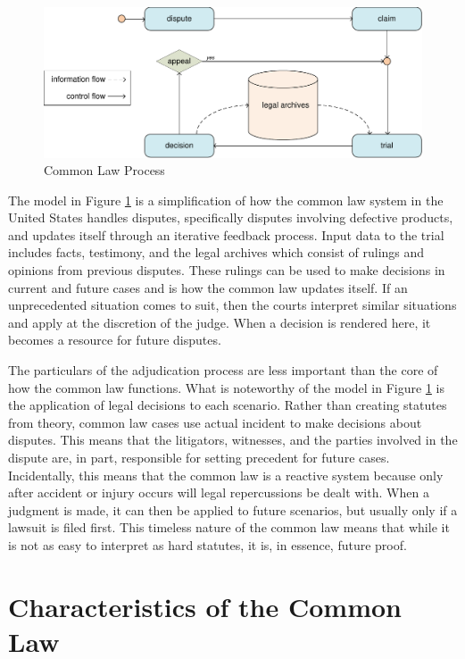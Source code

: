 \documentclass[12pt]{report}
\begin{document}
\begin{figure}[t] 
\begin{center} 
\includegraphics[scale=0.73]{figures/commonlaw.pdf} 
\end{center} 
\caption{Common Law Process} 
\label{fig:commonlaw} 
\end{figure} 

The model in Figure \ref{fig:commonlaw} is a simplification of how the common law system in the United States handles disputes, specifically disputes involving defective products, and updates itself through an iterative feedback process. Input data to the trial includes facts, testimony, and the legal archives which consist of rulings and opinions from previous disputes. These rulings can be used to make decisions in current and future cases and is how the common law updates itself. If an unprecedented situation comes to suit, then the courts interpret similar situations and apply at the discretion of the judge. When a decision is rendered here, it becomes a resource for future disputes.

The particulars of the adjudication process are less important than the core of how the common law functions. What is noteworthy of the model in Figure \ref{fig:commonlaw} is the application of legal decisions to each scenario. Rather than creating statutes from theory, common law cases use actual incident to make decisions about disputes. This means that the litigators, witnesses, and the parties involved in the dispute are, in part, responsible for setting precedent for future cases. Incidentally, this means that the common law is a reactive system because only after accident or injury occurs will legal repercussions be dealt with. When a judgment is made, it can then be applied to future scenarios, but usually only if a lawsuit is filed first. This timeless nature of the common law means that while it is not as easy to interpret as hard statutes, it is, in essence, future proof.

\section{Characteristics of the Common Law} 
\end{document}
